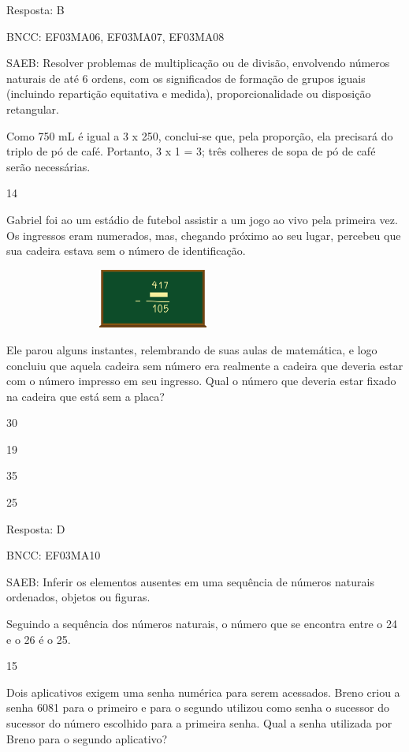 \begin{escolha}
{\begin{escolha}
{Resposta: B

BNCC: EF03MA06, EF03MA07, EF03MA08

SAEB: Resolver problemas de multiplicação ou de divisão,
envolvendo números naturais de até 6 ordens, com os significados de formação de grupos iguais (incluindo
repartição equitativa e medida), proporcionalidade ou disposição
retangular.

Como 750 mL é igual a 3 x 250, conclui-se que, pela proporção, ela
precisará do triplo de pó de café. Portanto, 3 x 1 = 3; três colheres de sopa de pó de café serão necessárias.

\num{14}

Gabriel foi ao um estádio de futebol assistir a um jogo ao vivo pela
primeira vez. Os ingressos eram numerados, mas, chegando próximo ao seu
lugar, percebeu que sua cadeira estava sem o número de identificação.


\includegraphics[width=3.87534in,height=0.76673in]{media/image122.png}

Ele parou alguns instantes, relembrando de suas aulas de matemática, e
logo concluiu que aquela cadeira sem número era realmente a cadeira que
deveria estar com o número impresso em seu ingresso. Qual o número que
deveria estar fixado na cadeira que está sem a placa?

\begin{escolha}
\item
  30
\item
  19
\item
  35
\item
  25
\end{escolha}

Resposta: D

BNCC: EF03MA10

SAEB: Inferir os elementos ausentes em uma sequência de
números naturais ordenados, objetos ou figuras.

Seguindo a sequência dos números naturais, o número que se encontra entre o 24 e o 26 é o 25.

\num{15}

Dois aplicativos exigem uma senha numérica para serem acessados. Breno criou a senha 6081 para o primeiro e para o segundo utilizou como senha
o sucessor do sucessor do número escolhido para a primeira senha. Qual a
senha utilizada por Breno para o segundo aplicativo?

}
\end{escolha}}
\end{escolha}
